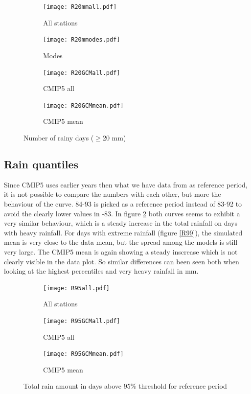 \documentclass{article}
\begin{document}
\begin{figure}[H]
	\centering
	\begin{subfigure}{0.5\textwidth}
		\centering
		\texttt{[image: R20mmall.pdf]}
		\caption{All stations}
	\end{subfigure}%
	\begin{subfigure}{0.5\textwidth}
		\centering
		\texttt{[image: R20mmodes.pdf]}
		\caption{Modes}
	\end{subfigure}
	\begin{subfigure}{0.5\textwidth}
		\centering
		\texttt{[image: R20GCMall.pdf]}
		\caption{CMIP5 all}
	\end{subfigure}%
	\begin{subfigure}{0.5\textwidth}
		\centering
		\texttt{[image: R20GCMmean.pdf]}
		\caption{CMIP5 mean}
	\end{subfigure}
	\caption{Number of rainy days ($\geq$20 mm)}
	\label{R20mm}
\end{figure}

\subsection{Rain quantiles}
Since CMIP5 uses earlier years then what we have data from as reference period, it is not possible to compare the numbers with each other, but more the behaviour of the curve. 84-93 is picked as a reference period instead of 83-92 to avoid the clearly lower values in -83. In figure \ref{R95} both curves seems to exhibit a very similar behaviour, which is a steady increase in the total rainfall on days with heavy rainfall. For days with extreme rainfall (figure \ref{R99}), the simulated mean is very close to the data mean, but the spread among the models is still very large. The CMIP5 mean is again showing a steady inscrease which is not clearly visible in the data plot. So similar differences can been seen both when looking at the highest percentiles and very heavy rainfall in mm. 
\begin{figure}[H]
	\centering
	\begin{subfigure}{0.5\textwidth}
		\centering
		\texttt{[image: R95all.pdf]}
		\caption{All stations}
	\end{subfigure}%
	\begin{subfigure}{0.5\textwidth}
		\centering
		\texttt{[image: R95GCMall.pdf]}
		\caption{CMIP5 all}
	\end{subfigure}
	\begin{subfigure}{0.5\textwidth}
		\centering
		\texttt{[image: R95GCMmean.pdf]}
		\caption{CMIP5 mean}
	\end{subfigure}
	\caption{Total rain amount in days above 95\% threshold for reference period}
	\label{R95}
\end{figure}
\end{document}
